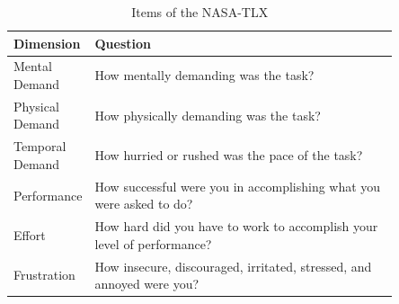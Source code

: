 \begin{table}[htpb]
  \centering
  \caption{Items of the NASA-TLX}
  \label{tab:app_nasatlx}
  \begin{tabular}{lp{0.85\linewidth}}
    \toprule
    \textbf{Dimension} & \textbf{Question} \\
    \midrule
    Mental Demand & How mentally demanding was the task? \\
    Physical Demand & How physically demanding was the task? \\
    Temporal Demand & How hurried or rushed was the pace of the task? \\
    Performance & How successful were you in accomplishing what you were asked to do? \\
    Effort & How hard did you have to work to accomplish your level of performance? \\
    Frustration & How insecure, discouraged, irritated, stressed, and annoyed were you? \\
    \bottomrule
  \end{tabular}
\end{table}

